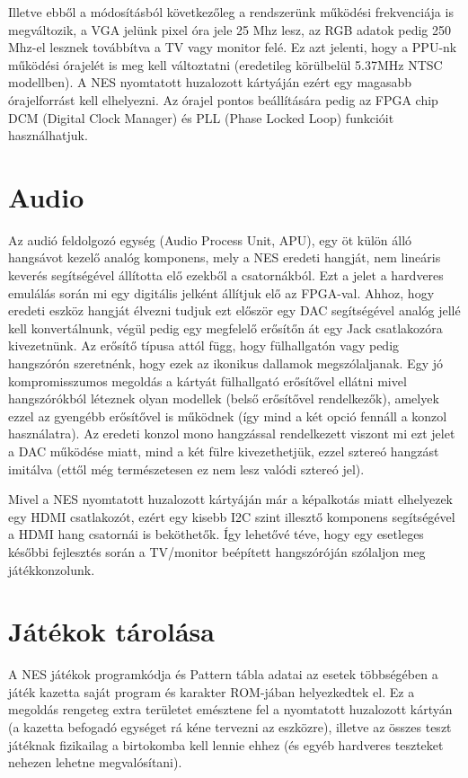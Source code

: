 Illetve ebből a módosításból következőleg a rendszerünk működési frekvenciája is megváltozik, a VGA jelünk pixel óra jele 25 Mhz lesz, az RGB adatok pedig 250 Mhz-el lesznek továbbítva a TV vagy monitor felé. Ez azt jelenti, hogy a PPU-nk működési órajelét is meg kell változtatni (eredetileg körülbelül 5.37MHz NTSC modellben). A NES nyomtatott huzalozott kártyáján ezért egy magasabb órajelforrást kell elhelyezni. Az órajel pontos beállítására pedig az FPGA chip DCM (Digital Clock Manager) és PLL (Phase Locked Loop) funkcióit használhatjuk.  

\section{Audio}
Az audió feldolgozó egység (Audio Process Unit, APU), egy öt külön álló hangsávot kezelő analóg komponens, mely a NES eredeti hangját, nem lineáris keverés segítségével állította elő ezekből a csatornákból. Ezt a jelet a hardveres emulálás során mi egy digitális jelként állítjuk elő az FPGA-val. Ahhoz, hogy eredeti eszköz hangját élvezni tudjuk ezt először egy DAC segítségével analóg jellé kell konvertálnunk, végül pedig egy megfelelő erősítőn át egy Jack csatlakozóra kivezetnünk. Az erősítő típusa attól függ, hogy fülhallgatón vagy pedig hangszórón szeretnénk, hogy ezek az ikonikus dallamok megszólaljanak. Egy jó kompromisszumos megoldás a kártyát fülhallgató erősítővel ellátni mivel hangszórókból léteznek olyan modellek (belső erősítővel rendelkezők), amelyek ezzel az gyengébb erősítővel is működnek (így mind a két opció fennáll a konzol használatra). Az eredeti konzol mono hangzással rendelkezett viszont mi ezt jelet a DAC működése miatt, mind a két fülre kivezethetjük, ezzel sztereó hangzást imitálva (ettől még természetesen ez nem lesz valódi sztereó jel).   

Mivel a NES nyomtatott huzalozott kártyáján már a képalkotás miatt elhelyezek egy HDMI csatlakozót, ezért egy kisebb I2C szint illesztő komponens segítségével a HDMI hang csatornái is beköthetők. Így lehetővé téve, hogy egy esetleges későbbi fejlesztés során a TV/monitor beépített hangszóróján szólaljon meg játékkonzolunk. 

\section{Játékok tárolása}
\label{sec:Game-store}
A NES játékok programkódja és Pattern tábla adatai az esetek többségében a játék kazetta saját program és karakter ROM-jában helyezkedtek el. Ez a megoldás rengeteg extra területet emésztene fel a nyomtatott huzalozott kártyán (a kazetta befogadó egységet rá kéne tervezni az eszközre), illetve az összes teszt játéknak fizikailag a birtokomba kell lennie ehhez (és egyéb hardveres teszteket nehezen lehetne megvalósítani). 


